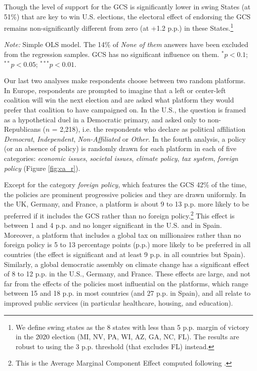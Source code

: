Though the level of support for the GCS is significantly lower in swing States (at 51\%) that are key to win U.S. elections, the electoral effect of endorsing the GCS remains non-significantly different from zero (at +1.2 p.p.) in these States.\footnote{We define swing states as the 8 states with less than 5 p.p. margin of victory in the 2020 election (MI, NV, PA, WI, AZ, GA, NC, FL). The results are robust to using the 3 p.p. threshold (that excludes FL) instead.}
\begin{table}[h]
  \caption[Influence of the GCS on electoral prospects]{Preference for a progressive platform depending on whether it includes the GCS or not. (Question \ref{q:conjoint_c}) 
} %
  \makebox[\textwidth][c]{}\label{tab:conjoint_c}
  {\footnotesize \textit{Note:} Simple OLS model. The 14\% of \textit{None of them} answers have been excluded from the regression samples. GCS has no significant influence on them. $^{*}p<0.1$; $^{**} p<0.05$; $^{***} p<0.01$. 
  }
\end{table}
\begin{stretchpars}
Our last two analyses  make respondents choose between two random platforms. In Europe, respondents are prompted to imagine that a left or center-left coalition will win the next election and are asked what platform they would prefer that coalition to have campaigned on. In the U.S., the question is framed as a hypothetical duel in a Democratic primary, and asked only to non-Republicans ($n$ = 2,218), i.e. the respondents who declare as political affiliation \textit{Democrat}, \textit{Independent}, \textit{Non-Affiliated} or \textit{Other}. In the fourth analysis, a policy (or an absence of policy) is randomly drawn for each platform in each of five categories: \textit{economic issues}, \textit{societal issues}, \textit{climate policy}, \textit{tax system}, \textit{foreign policy} (Figure \ref{fig:ca_r}). 

Except for the category \textit{foreign policy}, which features the GCS 42\% of the time, the policies are prominent progressive policies and they are drawn uniformly. %
In the UK, Germany, and France, a platform is about 9 to 13 p.p. more likely to be preferred if it includes the GCS rather than no foreign policy.\footnote{This is the Average Marginal Component Effect computed following \citet{hainmueller_causal_2014}.} This effect is between 1 and 4 p.p. and no longer significant in the U.S. and in Spain. Moreover, a platform that includes a global tax on millionaires rather than no foreign policy is 5 to 13 percentage points (p.p.) more likely to be preferred in all countries (the effect is significant and at least 9 p.p. in all countries but Spain). 
Similarly, a global democratic assembly on climate change has a significant effect of 8 to 12 p.p. in the U.S., Germany, and France. 
These effects are large, and not far from the effects of the policies most influential on the platforms, which range between 15 and 18 p.p. in most countries (and 27 p.p. in Spain), and all relate to improved public services (in particular healthcare, housing, and education).
\end{stretchpars}
 
